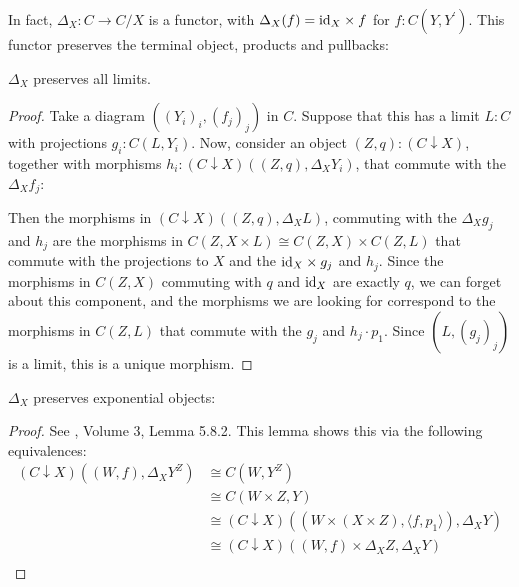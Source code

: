 In fact, $ \Delta_X : C \to C / X $ is a functor, with $ \Delta_X(f) = \text{id}_{X} \times f $ for $ f: C(Y, Y^\prime) $. This functor preserves the terminal object, products and pullbacks:
\begin{lemma}\label{lem:delta-limits}
  $ \Delta_X $ preserves all limits.
\end{lemma}
\begin{proof}
  Take a diagram $ ((Y_i)_i, (f_j)_j) $ in $ C $. Suppose that this has a limit $ L : C $ with projections $ g_i : C(L, Y_i) $. Now, consider an object $ (Z, q) : (C \downarrow X) $, together with morphisms $ h_i : (C \downarrow X)((Z, q), \Delta_X Y_i) $, that commute with the $ \Delta_X f_j $:
  \begin{center}
  \end{center}
  Then the morphisms in $ (C \downarrow X)((Z, q), \Delta_X L) $, commuting with the $ \Delta_X g_j $ and $ h_j $ are the morphisms in $ C(Z, X \times L) \cong C(Z, X) \times C(Z, L) $ that commute with the projections to $ X $ and the $ \text{id}_{X} \times g_j $ and $ h_j $. Since the morphisms in $ C(Z, X) $ commuting with $ q $ and $ \text{id}_{X} $ are exactly $ q $, we can forget about this component, and the morphisms we are looking for correspond to the morphisms in $ C(Z, L) $ that commute with the $ g_j $ and $ h_j \cdot p_1 $. Since $ (L, (g_j)_j) $ is a limit, this is a unique morphism.
\end{proof}

\begin{lemma}\label{lem:delta-exponentials}
  $ \Delta_X $ preserves exponential objects:
\end{lemma}
\begin{proof}
  See \autocite{borceux}, Volume 3, Lemma 5.8.2. This lemma shows this via the following equivalences:
  \begin{align*}
    (C \downarrow X)((W, f), \Delta_X Y^Z) &\cong C(W, Y^Z)\\
    &\cong C(W \times Z, Y)\\
    &\cong (C \downarrow X)((W \times (X \times Z), \langle f, p_1 \rangle), \Delta_X Y)\\
    &\cong (C \downarrow X)((W, f) \times \Delta_X Z, \Delta_X Y)\\
  \end{align*}
\end{proof}

